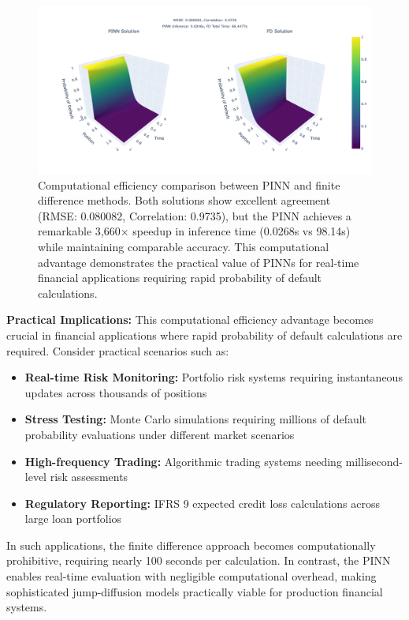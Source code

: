 \documentclass[11pt,twoside,openright]{report}
\begin{document}
\begin{figure}[htbp]
    \centering
    \includegraphics[width=\textwidth]{Figures/comparison_side_by_side.png}
    \caption{Computational efficiency comparison between PINN and finite difference methods. Both solutions show excellent agreement (RMSE: 0.080082, Correlation: 0.9735), but the PINN achieves a remarkable 3,660× speedup in inference time (0.0268s vs 98.14s) while maintaining comparable accuracy. This computational advantage demonstrates the practical value of PINNs for real-time financial applications requiring rapid probability of default calculations.}
    \label{fig:pinn_fd_comparison}
\end{figure}

\textbf{Practical Implications:} This computational efficiency advantage becomes crucial in financial applications where rapid probability of default calculations are required. Consider practical scenarios such as:
\begin{itemize}
    \item \textbf{Real-time Risk Monitoring:} Portfolio risk systems requiring instantaneous updates across thousands of positions
    \item \textbf{Stress Testing:} Monte Carlo simulations requiring millions of default probability evaluations under different market scenarios
    \item \textbf{High-frequency Trading:} Algorithmic trading systems needing millisecond-level risk assessments
    \item \textbf{Regulatory Reporting:} IFRS 9 expected credit loss calculations across large loan portfolios
\end{itemize}

In such applications, the finite difference approach becomes computationally prohibitive, requiring nearly 100 seconds per calculation. In contrast, the PINN enables real-time evaluation with negligible computational overhead, making sophisticated jump-diffusion models practically viable for production financial systems.
\end{document}
